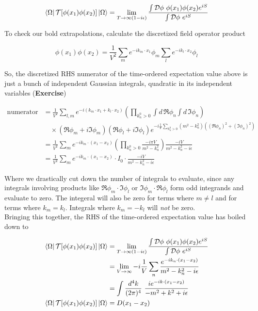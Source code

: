 \begin{equation}
\bra{\Omega} \mathcal{T} [ \phi (x_1) \phi (x_2) ] \ket{\Omega} = \lim_{T \rightarrow \infty (1 - i \epsilon)} \frac{\int \mathcal{D} \phi \,\, \phi(x_1) \phi(x_2) e^{i S}}{\int \mathcal{D} \phi \,\, e^{i S}}
\end{equation}

\noindent To check our bold extrapolations, calculate the discretized field operator product

\begin{equation}
\phi (x_1) \phi (x_2) = \frac{1}{V^2} \sum_m e^{-i k_m \cdot x_1} \phi_m \sum_l e^{-i k_l \cdot x_2} \phi_l
\end{equation}

\noindent So, the discretized RHS numerator of the time-ordered expectation value above is just a bunch of  independent Gaussian integrals, quadratic in its independent variables (\textbf{Exercise})

\begin{align*}
\text{numerator} &= \frac{1}{V^2} \sum_{l,m} e^{-i (k_m \cdot x_1 + k_l \cdot x_2)} \left( \prod_{k_n^0 > 0} \int d \, \Re \phi_n \int d \, \Im \phi_n  \right) \\
&\,\,\,\,\,\, \times (\Re \phi_m + i \Im \phi_m ) (\Re \phi_l + i \Im \phi_l) e^{-i\frac{1}{V} \sum_{k_n^0 > 0} (m^2 - k_n^2 ) ((\Re \phi_n)^2 + (\Im \phi_n)^2)} \\
&= \frac{1}{V^2} \sum_m e^{-i k_m \cdot (x_1 - x_2)} \left( \prod_{k_n^0 > 0} \frac{-i \pi V}{m^2 - k_n^2} \right) \frac{-i V}{m^2 - k_n^2 - i \epsilon} \\
&= \frac{1}{V^2} \sum_m e^{-i k_m \cdot (x_1 - x_2)} \cdot I_0 \cdot \frac{-i V}{m^2 - k_n^2 - i \epsilon} 
\end{align*}

\noindent Where we drastically cut down the number of integrals to evaluate, since any integrals involving products like $\Re \phi_m \cdot \Im \phi_l$ or $\Im \phi_m \cdot \Re \phi_l$ form odd integrands and evaluate to zero. The integeral will also be zero for terms where $m \ne l$ and for terms where $k_m = k_l$. Integrals where $k_m = -k_l$ will \textit{not} be zero. \\

\noindent Bringing this together, the RHS of the time-ordered expectation value has boiled down to 

\begin{align}
\bra{\Omega} \mathcal{T} [ \phi (x_1) \phi (x_2) ] \ket{\Omega} &= \lim_{T \rightarrow \infty (1 - i \epsilon)} \frac{\int \mathcal{D} \phi \,\, \phi(x_1) \phi(x_2) e^{i S}}{\int \mathcal{D} \phi \,\, e^{i S}} \\
&= \lim_{V \rightarrow \infty} -i \frac{1}{V} \sum_n \frac{e^{-i k_n \cdot (x_1 - x_2) }}{m^2 - k_n^2 - i \epsilon} \\
&= \int \frac{d^4 k}{(2\pi)^4} \, \, \frac{i e^{-i k \cdot (x_1 - x_2)}}{-m^2 + k^2 + i \epsilon} \\
\bra{\Omega} \mathcal{T} [ \phi (x_1) \phi (x_2) ] \ket{\Omega} &= D(x_1 - x_2)
\end{align}


